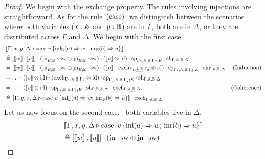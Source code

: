 \documentclass[a4paper,UKenglish,cleveref, autoref, thm-restate]{lipics-v2021}
\begin{document}
\begin{proof}
  We begin with the exchange property. The rules involving injections are
  straightforward. As for the rule~$(\mathrm{case})$, we distinguish between
  the scenarios where both variables ($x : \mathbb{A}$ and $y : \mathbb{B}$) are in
  $\Gamma$, both are in $\Delta$, or they are distributed across $\Gamma$ and
  $\Delta$. We begin with the first case. 
  \begin{align*}
    & \sem{\Gamma,x, y, \Delta \vljud \text{case }  v\,  \{\text{inl}_{\typeD} (a) \Rightarrow w ;\, \text{inr}_{\typeE} (b) \Rightarrow u\}} \\ 
    &\triangleq   [\sem{w}  , \sem{u}] \comp (\text{jn}_{E;\typeD}
    \comp \sw \oplus \text{jn}_{E;\typeE } \comp \sw) 
    \comp (\sem{ v} \otimes \id)  
    \comp \text{sp}_{\Gamma_{1},\typeA, \typeB,\Gamma_{2};E} 
    \comp \text{sh}_{\Gamma,\typeA, \typeB,\Delta}
    & \\
    & =  [\sem{w},\sem{u}] \comp (\text{jn}_{E;\typeD}
    \comp \sw \oplus \text{jn}_{E;\typeE } \comp \sw) 
    \comp (\sem{v} \comp\, \text{exch}_{\Gamma_{1}, \underline{\typeA,\typeB},\Gamma_{2}} 
    \otimes \id) \comp \text{sp}_{\Gamma_{1},\typeA, \typeB,\Gamma_{2};E} 
    \comp \text{sh}_{\Gamma,\typeA, \typeB,\Delta}
    & \text{(Induction)}\\
    &  =  \dots  \comp (\sem{v} \otimes \id) 
          \comp (\text{exch}_{\Gamma_1, \underline{\typeA, \typeB}, \Gamma_2} \otimes \text{id}) \comp \text{sp}_{\Gamma_{1},\typeA,\typeB, \Gamma_{2};E} \comp  \text{sh}_{\Gamma,\typeA, \typeB,\Delta} & {}\\
    & = \dots \comp (\sem{v} \otimes \id) \comp \text{sp}_{\Gamma_{1},\typeB,\typeA, \Gamma_{2};E} 
          \comp \text{sh}_{\Gamma,\typeB, \typeA,\Delta}  
          \comp \text{exch}_{\Gamma,  \underline{\typeA,\typeB}, \Delta} 
    & {\text{(Coherence)}} \\
    & \triangleq \sem{\Gamma,y, x, \Delta \vljud \text{case } v\,  \{\text{inl}_{\typeE} (a) \Rightarrow w ;\, \text{inr}_{\typeD} (b) \Rightarrow u\}} 
    \comp \text{exch}_{\Gamma,  \underline{\typeA, \typeB}, \Delta}
  \end{align*}
Let us now focus on the second case, \ie\ both variables live in $\Delta$.
\begin{align*}
  & \sem{\Gamma,x, y, \Delta \vljud \text{case } \, v\, \{\text{inl} (a) \Rightarrow w ;\, \text{inr} (b) \Rightarrow u\}} \\
  & \triangleq  [\sem{w} ,\sem{u}]\comp (\text{jn}
  \comp \sw \oplus \text{jn} \comp \sw) 

\end{align*}
\end{proof}
\end{document}
